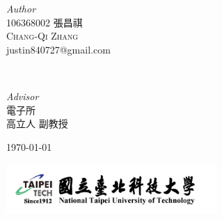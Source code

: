 \begin{titlepage}
	\begin{CJK}{UTF8}{bsmi}
		\begin{minipage}{0.4\textwidth}
			\begin{flushleft}
				\large
				\textit{Author}\\
				106368002 張昌祺\\ 
				\textsc{Chang-Qi Zhang} \\
				justin840727@gmail.com %
			\end{flushleft}
		\end{minipage}
		~
		\begin{minipage}{0.4\textwidth}
			\begin{flushright}
				\large
				\textit{Advisor}\\
				電子所 \\
				高立人 副教授 %
			\end{flushright}
		\end{minipage}
	\end{CJK}
		
		
	\vfill\vfill\vfill %
		
	{\large\today} %
		
		
	\vfill
	\includegraphics[width=0.6\textwidth]{../../logo.jpg}\\[1cm] %
			 
			
			
	\end{titlepage}
